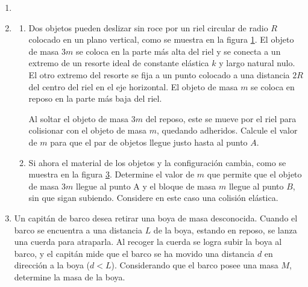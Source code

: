 \documentclass[letterpaper,11pt]{article}
\begin{document}
\vspace{-1cm}
\begin{enumerate}\setlength{\itemsep}{0.4cm}

\item[]

\item 
\begin{enumerate}
    \item Dos objetos pueden deslizar sin roce por un riel circular de radio $R$ colocado en un plano vertical, como se muestra en la figura \ref{fig1}. El objeto de masa $3m$ se coloca en la parte más alta del riel y se conecta a un extremo de un resorte ideal de constante elástica $k$ y largo natural nulo. El otro extremo del resorte se fija a un punto colocado a una distancia $2R$ del centro del riel en el eje horizontal. El objeto de masa $m$ se coloca en reposo en la parte más baja del riel.

    Al soltar el objeto de masa $3m$ del reposo, este se mueve por el riel para colisionar con el objeto de masa $m$, quedando adheridos. Calcule el valor de $m$ para que el par de objetos llegue justo hasta al punto $A$.


    \item Si ahora el material de los objetos y la configuración cambia, como se muestra en la figura \ref{fig2}. Determine el valor de $m$ que permite que el objeto de masa $3m$ llegue al punto A y el bloque de masa $m$ llegue al punto $B$, sin que sigan subiendo. Considere en este caso una colisión elástica.
\end{enumerate}

\begin{figure}[H]
    \centering
    \begin{subfigure}[t]{0.45\textwidth}
        \centering
        
        \caption{}
        \label{fig1}
    \end{subfigure}
    \begin{subfigure}[t]{0.35\textwidth}
        \centering
        
        \caption{}
        \label{fig2}
    \end{subfigure}
\end{figure}

\item Un capitán de barco desea retirar una boya de masa desconocida. Cuando el barco se encuentra a una distancia $L$ de la boya, estando en reposo, se lanza una cuerda para atraparla. Al recoger la cuerda se logra subir la boya al barco, y el capitán mide que el barco se ha movido una distancia $d$ en dirección a la boya ($d<L$). Considerando que el barco posee una masa $M$, determine la masa de la boya.


\end{enumerate}
\end{document}
